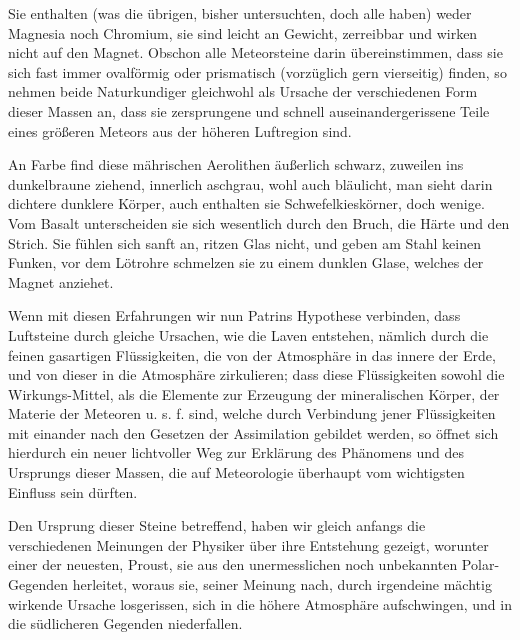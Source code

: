 \documentclass[a4paper, 11pt, oneside, polutonikogreek, german]{article}
\begin{document}
Sie enthalten (was die übrigen, bisher untersuchten, doch alle haben) weder Magnesia noch Chromium, sie sind leicht an Gewicht, zerreibbar und wirken nicht auf den Magnet. Obschon alle Meteorsteine darin übereinstimmen, dass sie sich fast immer ovalförmig oder prismatisch (vorzüglich gern vierseitig) finden, so nehmen beide Naturkundiger gleichwohl als Ursache der verschiedenen Form dieser Massen an, dass sie zersprungene und schnell auseinandergerissene Teile eines größeren Meteors aus der höheren Luftregion sind.

An Farbe find diese mährischen Aerolithen äußerlich schwarz, zuweilen ins dunkelbraune ziehend, innerlich aschgrau, wohl auch bläulicht, man sieht darin dichtere dunklere Körper, auch enthalten sie Schwefelkieskörner, doch wenige. Vom Basalt unterscheiden sie sich wesentlich durch den Bruch, die Härte und den Strich. Sie fühlen sich sanft an, ritzen Glas nicht, und geben am Stahl keinen Funken, vor dem Lötrohre schmelzen sie zu einem dunklen Glase, welches der Magnet anziehet.

Wenn mit diesen Erfahrungen wir nun Patrins Hypothese verbinden, dass Luftsteine durch gleiche Ursachen, wie die Laven entstehen, nämlich durch die feinen gasartigen Flüssigkeiten, die von der Atmosphäre in das innere der Erde, und von dieser in die Atmosphäre zirkulieren; dass diese Flüssigkeiten sowohl die Wirkungs-Mittel, als die Elemente zur Erzeugung der mineralischen Körper, der Materie der Meteoren u. s. f. sind, welche durch Verbindung jener Flüssigkeiten mit einander nach den Gesetzen der Assimilation gebildet werden, so öffnet sich hierdurch ein neuer lichtvoller Weg zur Erklärung des Phänomens und des Ursprungs dieser Massen, die auf Meteorologie überhaupt vom wichtigsten Einfluss sein dürften.

Den Ursprung dieser Steine betreffend, haben wir gleich anfangs die verschiedenen Meinungen der Physiker über ihre Entstehung gezeigt, worunter einer der neuesten, Proust, sie aus den unermesslichen noch unbekannten Polar-Gegenden herleitet, woraus sie, seiner Meinung nach, durch irgendeine mächtig wirkende Ursache losgerissen, sich in die höhere Atmosphäre aufschwingen, und in die südlicheren Gegenden niederfallen.
\end{document}
